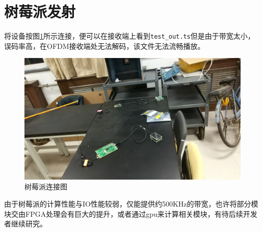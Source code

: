 	\section{树莓派发射}
		\par 将设备按图\ref{fig:dvbt_raspi}所示连接，便可以在接收端上看到\lstinline[language=sh]{test_out.ts}但是由于带宽太小，误码率高，在OFDM接收端处无法解码，该文件无法流畅播放。
		\begin{figure}[htp]
			\centering
			\includegraphics[width=13cm]{figures/dvbt_raspi.jpg}
			\caption{树莓派连接图}
			\label{fig:dvbt_raspi}
		\end{figure}
		\par 由于树莓派的计算性能与IO性能较弱，仅能提供约500KHz的带宽，也许将部分模块交由FPGA处理会有巨大的提升，或者通过gpu来计算相关模块，有待后续开发者继续研究。
